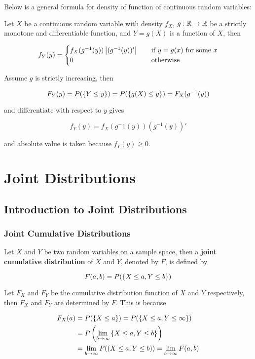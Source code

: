 \documentclass[a4paper,12pt]{article}
\begin{document}
Below is a general formula for density of function of continuous random variables:\n

\begin{thm}
  Let $X$ be a continuous random variable with density $f_{X}$, $g:\mathbb{R}\to\mathbb{R}$ be a strictly monotone and differentiable function, and $Y=g(X)$ is a function of $X$, then

  $$f_{Y}(y)=\begin{cases}
    f_{X}(g^{-1}(y))\left| (g^{-1}(y))'\right|&\;\;\;\;\text{if }y=g(x)\text{ for some }x\\
    0&\;\;\;\;\text{otherwise}
  \end{cases}$$\s

  \prf Assume $g$ is strictly increasing, then

  $$F_{Y}(y)=P(\left\{ Y\leq y\right\})=P(\left\{ g(X)\leq y\right\})=F_{X}(g^{-1}(y))$$\s

  and differentiate with respect to $y$ gives

  $$f_{Y}(y)=f_{X}(g^-1(y))(g^{-1}(y))'$$\s

  and absolute value is taken because $f_{Y}(y)\geq 0$.
\end{thm}

\pagebreak

\section{Joint Distributions}
\subsection{Introduction to Joint Distributions}
\subsubsection{Joint Cumulative Distributions}
\begin{dft}
  Let $X$ and $Y$ be two random variables on a sample space, then a \textbf{joint cumulative distribution} of $X$ and $Y$, denoted by $F$, is defined by

  $$F(a,b)=P(\left\{ X\leq a,Y\leq b\right\})$$
\end{dft}\n

Let $F_{X}$ and $F_{Y}$ be the cumulative distribution function of $X$ and $Y$ respectively, then $F_{X}$ and $F_{Y}$ are determined by $F$. This is because

$$\begin{aligned}[t]
  F_{X}(a)&=P(\left\{ X\leq a\right\})=P(\left\{ X\leq a,Y\leq\infty\right\})\\
  &=P\left( \lim_{b\to\infty}\left\{ X\leq a,Y\leq b\right\}\right)\\
  &=\lim_{b\to\infty}P(\left( X\leq a,Y\leq b\right))=\lim_{b\to\infty}F(a,b)
\end{aligned}$$\s
\end{document}

